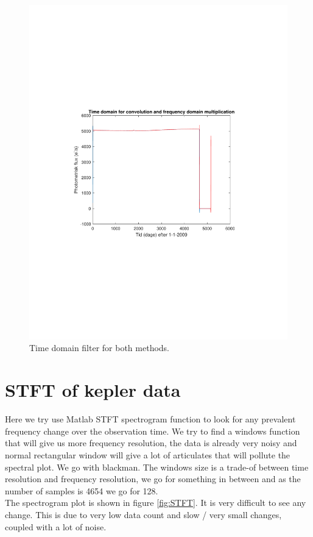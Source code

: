\begin{figure}[h]
  \centering
  \includegraphics[width=\textwidth]{matlabstuff/dft-methods.pdf}
  \caption{Time domain filter for both methods.}%
  \label{fig:dftmethods}
\end{figure}


\section{STFT of kepler data}

Here we try use Matlab STFT spectrogram function to look for any prevalent frequency change over the observation time. 
We try to find a windows function that will give us more frequency resolution, the data is already very noisy and normal rectangular window will give a lot of articulates that will pollute the spectral plot. We go with blackman. The windows size is a trade-of between time resolution and frequency resolution, we go for something in between and as the number of samples is 4654 we go for 128.    
\\
The spectrogram plot is shown in figure \ref{fig:STFT}. It is very difficult to see any change. This is due to very low data count and slow / very small changes, coupled with a lot of noise. 

